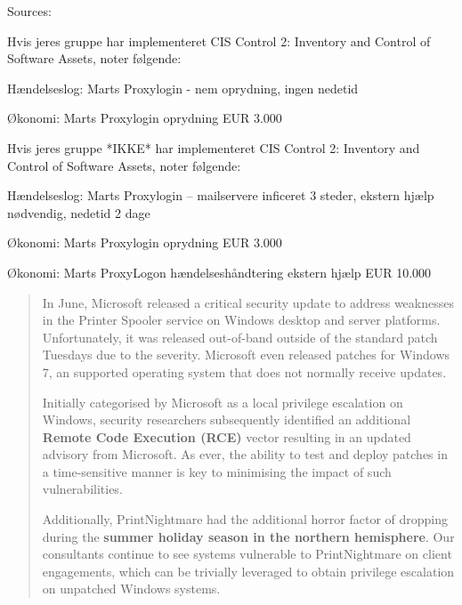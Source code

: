 \documentclass[Screen16to9,17pt]{foils}
\begin{document}
Sources: \\




Hvis jeres gruppe har implementeret CIS Control 2: Inventory and Control of Software Assets, noter følgende:
\begin{list2}
\item Hændelseslog: Marts Proxylogin - nem oprydning, ingen nedetid
\item Økonomi: Marts Proxylogin oprydning EUR 3.000
\end{list2}


Hvis jeres gruppe *IKKE* har implementeret CIS Control 2: Inventory and Control of Software Assets, noter følgende:
\begin{list2}
\item Hændelseslog: Marts Proxylogin -- mailservere inficeret 3 steder, ekstern hjælp nødvendig, nedetid 2 dage
\item Økonomi: Marts Proxylogin oprydning EUR 3.000
\item Økonomi: Marts ProxyLogon hændelseshåndtering ekstern hjælp EUR 10.000
\end{list2}



\begin{quote} \small
In June, Microsoft released a critical security update to address weaknesses in the Printer Spooler service on Windows desktop and server platforms. Unfortunately, it was released out-of-band outside of the standard patch Tuesdays due to the severity. Microsoft even released patches for Windows 7, an supported operating system that does not normally receive updates.

Initially categorised by Microsoft as a local privilege escalation on Windows, security researchers subsequently identified an additional {\bf Remote Code Execution (RCE)} vector resulting in an updated advisory from Microsoft. As ever, the ability to test and deploy patches in a time-sensitive manner is key to minimising the impact of such vulnerabilities.

Additionally, PrintNightmare had the additional horror factor of dropping during the {\bf summer holiday season in the northern hemisphere}. Our consultants continue to see systems vulnerable to PrintNightmare on client engagements, which can be trivially leveraged to obtain privilege escalation on unpatched Windows systems.
\end{quote}
\end{document}
